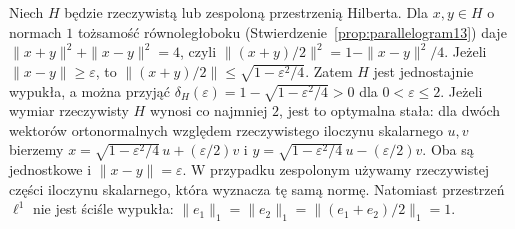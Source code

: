 \begin{przyklad}
\label{ex:modulus-hilbert26}
Niech $H$ będzie rzeczywistą lub zespoloną przestrzenią
Hilberta. Dla $x,y\in H$ o normach $1$ tożsamość
równoległoboku (Stwierdzenie~\ref{prop:parallelogram13}) daje
$\|x+y\|^2+\|x-y\|^2=4$, czyli
$\|(x+y)/2\|^2=1-\|x-y\|^2/4$.
Jeżeli $\|x-y\|\ge\varepsilon$, to
$\|(x+y)/2\|\le\sqrt{1-\varepsilon^2/4}$.
Zatem $H$ jest jednostajnie wypukła, a można przyjąć
$\delta_H(\varepsilon)=1-\sqrt{1-\varepsilon^2/4}>0$
dla $0<\varepsilon\le2$.
Jeżeli wymiar rzeczywisty $H$ wynosi co najmniej $2$,
jest to optymalna stała: dla dwóch wektorów
ortonormalnych względem rzeczywistego iloczynu skalarnego
$u,v$ bierzemy
$x=\sqrt{1-\varepsilon^2/4}\,u+(\varepsilon/2)v$
i $y=\sqrt{1-\varepsilon^2/4}\,u-(\varepsilon/2)v$.
Oba są jednostkowe i $\|x-y\|=\varepsilon$.
W przypadku zespolonym używamy rzeczywistej części
iloczynu skalarnego, która wyznacza tę samą normę.
Natomiast przestrzeń $\ell^1$ nie jest ściśle wypukła:
$\|e_1\|_1=\|e_2\|_1=\|(e_1+e_2)/2\|_1=1$.
\end{przyklad}

